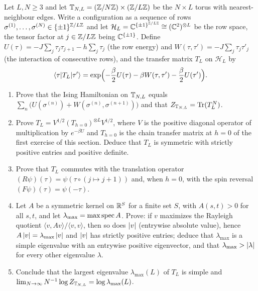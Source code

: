 \begin{exercise}
Let $L,N\ge3$ and let $\mathbb T_{N,L}=(\mathbb Z/N\mathbb Z)\times(\mathbb Z/L\mathbb Z)$ be the $N\times L$
torus with nearest-neighbour edges.  Write a configuration as a sequence of
rows $\sigma^{(1)},\dots,\sigma^{(N)}\in\{\pm1\}^{\mathbb Z/L\mathbb Z}$ and let
$\mathcal H_L=\mathbb C^{\{\pm1\}^{\mathbb Z/L\mathbb Z}}\cong(\mathbb C^2)^{\otimes L}$ be the row
space, the tensor factor at $j\in\mathbb Z/L\mathbb Z$ being $\mathbb C^{\{\pm1\}}$.  Define
$U(\tau)=-J\sum_{j}\tau_j\tau_{j+1}-h\sum_j\tau_j$ (the row energy) and
$W(\tau,\tau')=-J\sum_j\tau_j\tau'_j$ (the interaction of consecutive rows),
and the transfer matrix $T_L$ on $\mathcal H_L$ by
\[
 \langle\tau|T_L|\tau'\rangle=\exp\Bigl(-\frac\beta2U(\tau)-\beta W(\tau,\tau')-\frac\beta2U(\tau')\Bigr) .
\]
\begin{enumerate}[label=(\alph*)]
\item Prove that the Ising Hamiltonian on $\mathbb T_{N,L}$ equals
$\sum_{n}\bigl(U(\sigma^{(n)})+W(\sigma^{(n)},\sigma^{(n+1)})\bigr)$ and
that $Z_{\mathbb T_{N,L}}=\operatorname{Tr}(T_L^N)$.
\item Prove $T_L=V^{1/2}(T_{h=0})^{\otimes L}V^{1/2}$, where $V$ is the
positive diagonal operator of multiplication by $e^{-\beta U}$ and
$T_{h=0}$ is the chain transfer matrix at $h=0$ of the first exercise of this
section.  Deduce that $T_L$ is symmetric with strictly positive entries and
positive definite.
\item Prove that $T_L$ commutes with the translation operator
$(R\psi)(\tau)=\psi(\tau\circ(j\mapsto j+1))$ and, when $h=0$, with the spin
reversal $(F\psi)(\tau)=\psi(-\tau)$.
\item Let $A$ be a symmetric kernel on $\mathbb R^S$ for a finite set $S$,
with $A(s,t)>0$ for all $s,t$, and let
$\lambda_{\max}=\max\operatorname{spec} A$.  Prove: if $v$
maximizes the Rayleigh quotient $\langle v,Av\rangle/\langle v,v\rangle$, then
so does $\left\lvert v\right\rvert$ (entrywise absolute value), hence $A\left\lvert v\right\rvert=\lambda_{\max}\left\lvert v\right\rvert$ and
$\left\lvert v\right\rvert$ has strictly positive entries; deduce that $\lambda_{\max}$ is a
simple eigenvalue with an entrywise positive eigenvector, and that
$\lambda_{\max}>\left\lvert \lambda\right\rvert$ for every other eigenvalue $\lambda$.
\item Conclude that the largest eigenvalue $\lambda_{\max}(L)$ of $T_L$ is
simple and $\lim_{N\to\infty}N^{-1}\log Z_{\mathbb T_{N,L}}=\log\lambda_{\max}(L)$.
\end{enumerate}
\end{exercise}

